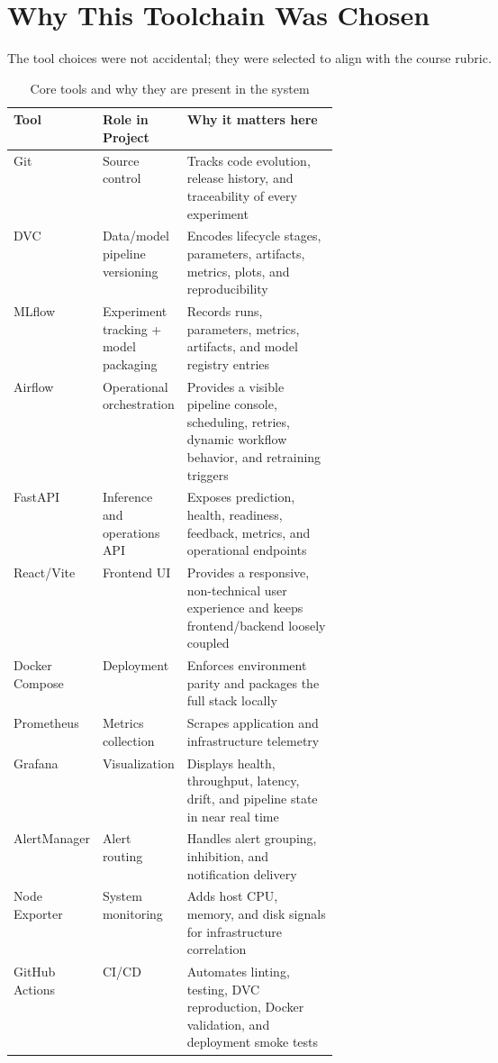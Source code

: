 \documentclass[11pt,a4paper]{article}
\begin{document}
\section{Why This Toolchain Was Chosen}

The tool choices were not accidental; they were selected to align with the course rubric.

\begin{table}[H]
  \centering
  \caption{Core tools and why they are present in the system}
  \begin{tabularx}{\linewidth}{>{\raggedright\arraybackslash}p{0.18\linewidth}>{\raggedright\arraybackslash}p{0.24\linewidth}X}
    \toprule
    \textbf{Tool} & \textbf{Role in Project} & \textbf{Why it matters here} \\
    \midrule
    Git & Source control & Tracks code evolution, release history, and traceability of every experiment \\
    DVC & Data/model pipeline versioning & Encodes lifecycle stages, parameters, artifacts, metrics, plots, and reproducibility \\
    MLflow & Experiment tracking + model packaging & Records runs, parameters, metrics, artifacts, and model registry entries \\
    Airflow & Operational orchestration & Provides a visible pipeline console, scheduling, retries, dynamic workflow behavior, and retraining triggers \\
    FastAPI & Inference and operations API & Exposes prediction, health, readiness, feedback, metrics, and operational endpoints \\
    React/Vite & Frontend UI & Provides a responsive, non-technical user experience and keeps frontend/backend loosely coupled \\
    Docker Compose & Deployment & Enforces environment parity and packages the full stack locally \\
    Prometheus & Metrics collection & Scrapes application and infrastructure telemetry \\
    Grafana & Visualization & Displays health, throughput, latency, drift, and pipeline state in near real time \\
    AlertManager & Alert routing & Handles alert grouping, inhibition, and notification delivery \\
    Node Exporter & System monitoring & Adds host CPU, memory, and disk signals for infrastructure correlation \\
    GitHub Actions & CI/CD & Automates linting, testing, DVC reproduction, Docker validation, and deployment smoke tests \\
    \bottomrule
  \end{tabularx}
\end{table}
\end{document}
